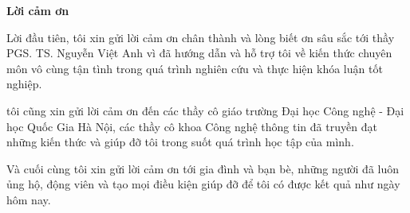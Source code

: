 \begin{center}
\textbf{\large{Lời cảm ơn}	}
\end{center}

Lời đầu tiên, tôi xin gửi lời cảm ơn chân thành và lòng biết ơn sâu sắc tới
thầy PGS. TS. Nguyễn Việt Anh vì đã hướng dẫn và hỗ trợ tôi về kiến thức chuyên môn vô cùng tận tình trong quá trình nghiên cứu
và thực hiện khóa luận tốt nghiệp.

tôi cũng xin gửi lời cảm ơn đến các thầy cô giáo trường Đại học Công nghệ - Đại học Quốc Gia Hà Nội, các thầy cô khoa Công nghệ thông tin đã truyền đạt những kiến thức và giúp đỡ tôi trong suốt quá trình học tập của mình.

Và cuối cùng tôi xin gửi lời cảm ơn tới gia đình và bạn bè, những người đã luôn ủng hộ, động viên và tạo mọi điều kiện giúp đỡ để tôi có được kết quả như ngày hôm nay. 